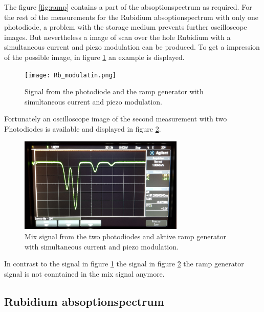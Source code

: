 The figure \ref{fig:ramp} contains a part of the
absoptionspectrum as required.
For the rest of the measurements for the Rubidium absoptionspectrum
with only one photodiode, a problem with the storage medium
prevents further oscilloscope images.
But nevertheless
a image of scan over the hole Rubidium
with a simultaneous current and piezo modulation
can be produced. To get a impression of the possible image,
in figure \ref{fig:theory_curve} an example is displayed.

\begin{figure}
  \centering
  \texttt{[image: Rb\_modulatin.png]}
  \caption{Signal from the photodiode and the ramp generator with
  simultaneous current and piezo modulation. \cite{V60}}
  \label{fig:theory_curve}
\end{figure}

Fortunately an oscilloscope image of the second measurement
with two Photodiodes
is available and displayed in figure \ref{fig:2dioden}.

\begin{figure}
  \centering
  \includegraphics[width = 0.7\textwidth]{./figures/Rb_spectrum.jpg}
  \caption{Mix signal from the two photodiodes and aktive ramp generator with
  simultaneous current and piezo modulation.}
  \label{fig:2dioden}
\end{figure}

In contrast to the signal in figure \ref{fig:theory_curve}
the signal in figure \ref{fig:2dioden} the
ramp generator signal is not conntained in the mix signal anymore.


\subsection{Rubidium absoptionspectrum}
\label{sec:ru_absoption}
